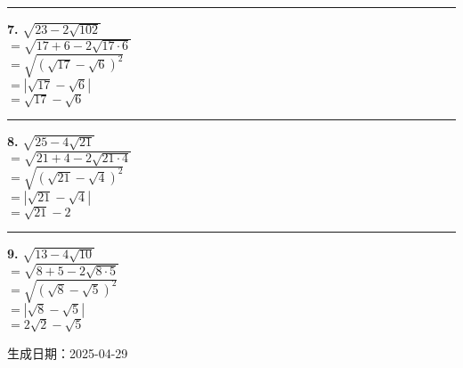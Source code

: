 \documentclass[a4paper,11pt]{article}
\begin{document}
\vspace{0.5em}
\noindent\rule{\textwidth}{0.4pt}  %
\noindent\textbf{7.} $\sqrt{23 - 2 \sqrt{102}}$ \\
$= \sqrt{17+6 - 2\sqrt{17\cdot6}}$ \\
$= \sqrt{(\sqrt{17} - \sqrt{6})^2}$ \\
$= |\sqrt{17} - \sqrt{6}|$ \\
$= \sqrt{17} - \sqrt{6}$

\vspace{0.5em}
\noindent\rule{\textwidth}{0.4pt}  %
\noindent\textbf{8.} $\sqrt{25 - 4 \sqrt{21}}$ \\
$= \sqrt{21+4 - 2\sqrt{21\cdot4}}$ \\
$= \sqrt{(\sqrt{21} - \sqrt{4})^2}$ \\
$= |\sqrt{21} - \sqrt{4}|$ \\
$= \sqrt{21} - 2$

\vspace{0.5em}
\noindent\rule{\textwidth}{0.4pt}  %
\noindent\textbf{9.} $\sqrt{13 - 4 \sqrt{10}}$ \\
$= \sqrt{8+5 - 2\sqrt{8\cdot5}}$ \\
$= \sqrt{(\sqrt{8} - \sqrt{5})^2}$ \\
$= |\sqrt{8} - \sqrt{5}|$ \\
$= 2\sqrt{2} - \sqrt{5}$

\vfill
\begin{center}
\small{生成日期：2025-04-29}
\end{center}
\end{document}
